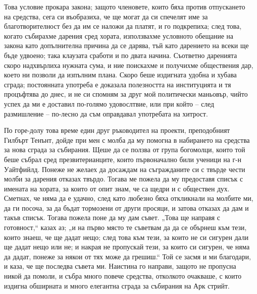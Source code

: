 \documentclass[12pt]{book}
\begin{document}
Това условие прокара закона; защото членовете, които бяха против отпускането на средства, сега си въобразиха, че ще могат да си спечелят име за благотворителност без да им се наложи да платят, и го подкрепиха; след това, когато събирахме дарения сред хората, използвахме условното обещание на закона като допълнителна причина да се дарява, тъй като дарението на всеки ще бъде удвоено; така клаузата сработи и по двата начина. Съответно даренията скоро надхвърлиха нужната сума, и ние поискахме и получихме обществения дар, което ни позволи да изпълним плана. Скоро беше издигната удобна и хубава сграда; постоянната употреба е доказала полезността на институцията и тя процъфтява до днес, и не си спомням за друг мой политически маньовър, чийто успех да ми е доставил по-голямо удовослтвие, или при който – след размишление – по-лесно да съм оправдавал употребата на хитрост.

По горе-долу това време един друг ръководител на проекти, преподобният Гилбърт Тенънт, дойде при мен с молба да му помогна в набирането на средства за нова сграда за събирания. Щеше да се ползва от група богомолци, които той беше събрал сред презвитерианците, които първоначално били ученици на г-н Уайтфийлд. Понеже не желаех да досаждам на съгражданите си с твърде чести молби за дарения отказах твърдо. Тогава ме пожела да му предоставя списък с имената на хората, за които от опит знам, че са щедри и с обществен дух. Сметнах, че няма да е удачно, след като любезно бяха откликнали на молбите ми, да ги посоча, за да бъдат тормозени от други просяци, и затова отказах да дам и такъв списък. Тогава пожела поне да му дам съвет. „Това ще направя с готовност,“ казах аз; „и на първо място те съветвам да да се обърнеш към тези, които знаеш, че ще дадат нещо; след това към тези, за които не си сигурен дали ще дадат нещо или не; и накрая не пропускай тези, за които си сигурен, че няма да дадат, понеже за някои от тях може да грешиш.“ Той се засмя и ми благодари, и каза, че ще последва съвета ми. Наистина го направи, защото не пропусна никой да помоли, и събра много повече средства, отколкото очакваше, с които издигна обширната и много елегантна сграда за събирания на Арк стрийт. 
\end{document}
